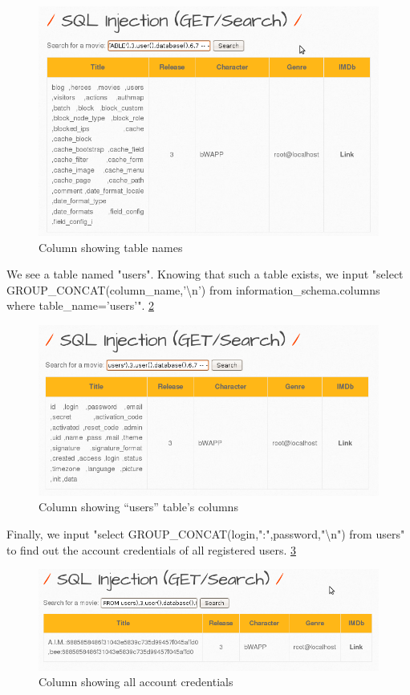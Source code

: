 \documentclass{article}
\begin{document}
\begin{figure}
    \centering
    \includegraphics[width=1\linewidth]{Figures/sqli/sqliattack-3.png}
    \caption{\label{fig: sqliattack-3}Column showing table names}
\end{figure}
We see a table named "users". Knowing that such a table exists, we input "select GROUP\_CONCAT(column\_name,'\textbackslash n') from information\_schema.columns where table\_name='users'". \ref{fig:sqliattack-4}
\begin{figure}
    \centering
    \includegraphics[width=1\linewidth]{Figures/sqli/sqliattack-4.png}
    \caption{\label{fig:sqliattack-4}Column showing “users” table’s columns}
\end{figure}
Finally, we input "select GROUP\_CONCAT(login,":",password,"\textbackslash n") from users" to find out the account credentials of all registered users. \ref{fig:sqliattack-5}
\begin{figure}
    \centering
    \includegraphics[width=1\linewidth]{Figures/sqli/sqliattack-5.png}
    \caption{\label{fig:sqliattack-5}Column showing all account credentials}
\end{figure}
\end{document}
